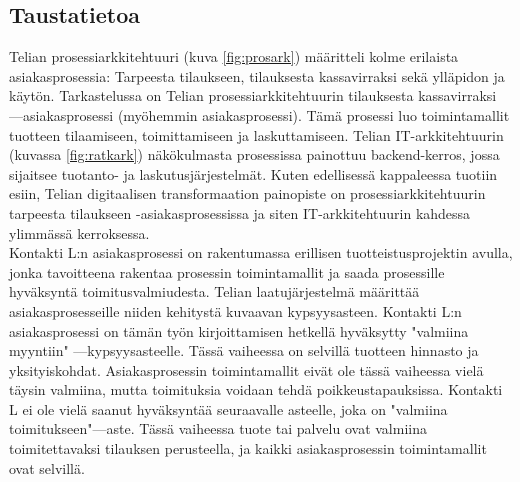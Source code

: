\documentclass[finnish,12pt,a4paper,pdftex]{article}
\begin{document}










\subsection{Taustatietoa}

Telian prosessiarkkitehtuuri (kuva \ref{fig:prosark}) määritteli kolme erilaista asiakasprosessia: Tarpeesta tilaukseen, tilauksesta kassavirraksi sekä ylläpidon ja käytön. Tarkastelussa on Telian prosessiarkkitehtuurin tilauksesta kassavirraksi —asiakasprosessi (myöhemmin asiakasprosessi). Tämä prosessi luo toimintamallit tuotteen tilaamiseen, toimittamiseen ja laskuttamiseen. Telian IT-arkkitehtuurin (kuvassa \ref{fig:ratkark}) näkökulmasta prosessissa painottuu backend-kerros, jossa sijaitsee tuotanto- ja laskutusjärjestelmät. Kuten edellisessä kappaleessa tuotiin esiin, Telian digitaalisen transformaation painopiste on prosessiarkkitehtuurin tarpeesta tilaukseen -asiakasprosessissa ja siten IT-arkkitehtuurin kahdessa ylimmässä kerroksessa. \\

Kontakti L:n asiakasprosessi on rakentumassa erillisen tuotteistusprojektin avulla, jonka tavoitteena rakentaa prosessin toimintamallit ja saada prosessille hyväksyntä toimitusvalmiudesta. Telian laatujärjestelmä määrittää asiakasprosesseille niiden kehitystä kuvaavan kypsyysasteen. Kontakti L:n asiakasprosessi on tämän työn kirjoittamisen hetkellä hyväksytty "valmiina myyntiin" —kypsyysasteelle. Tässä vaiheessa on selvillä tuotteen hinnasto ja yksityiskohdat. Asiakasprosessin toimintamallit eivät ole tässä vaiheessa vielä täysin valmiina, mutta toimituksia voidaan tehdä poikkeustapauksissa. Kontakti L ei ole vielä saanut hyväksyntää seuraavalle asteelle, joka on "valmiina toimitukseen"—aste. Tässä vaiheessa tuote tai palvelu ovat valmiina toimitettavaksi tilauksen perusteella, ja kaikki asiakasprosessin toimintamallit ovat selvillä.\\
\end{document}
